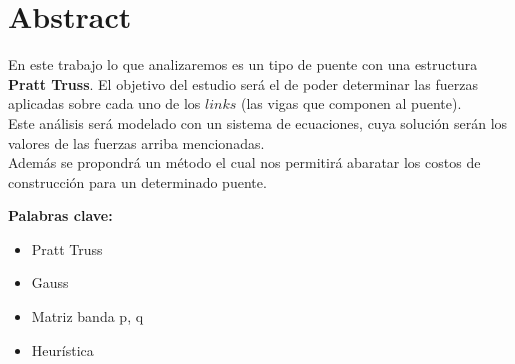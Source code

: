 \section{Abstract}

En este trabajo lo que analizaremos es un tipo de puente con una estructura {\bf Pratt Truss}. El objetivo del estudio será el de poder determinar las fuerzas aplicadas sobre cada uno de los $links$ (las vigas que componen al puente).\\

Este análisis será modelado con un sistema de ecuaciones, cuya solución serán los valores de las fuerzas arriba mencionadas.\\

Además se propondrá un método el cual nos permitirá abaratar los costos de construcción para un determinado puente.

{\bf Palabras clave:}
\begin{itemize} 
    \item Pratt Truss
    \item Gauss
    \item Matriz banda p, q
    \item Heurística
\end{itemize}
